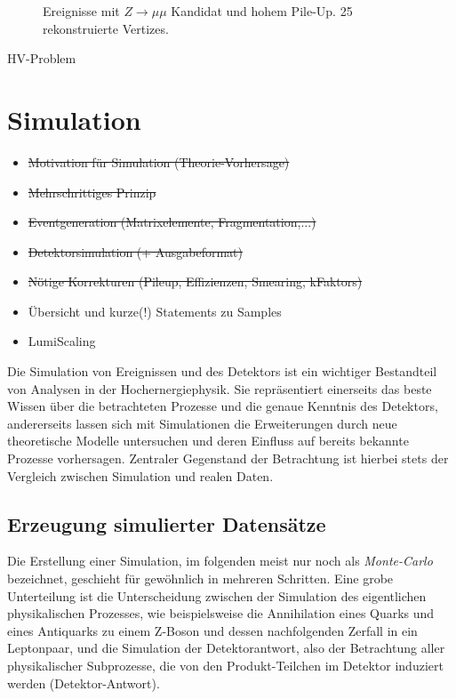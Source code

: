 \begin{figure}
\begin{minipage}[b]{0.48\textwidth}
        \captionsetup{format=plain}
        \caption{Ereignisse mit $Z \rightarrow \mu\mu$ Kandidat und hohem
            Pile-Up. 25 rekonstruierte Vertizes.}
        \label{fig:pileup}
    \end{minipage}
\end{figure}

HV-Problem \development



\section{Simulation}
\label{data_sim_selection:simulation}

\begin{itemize}
    \item \sout{Motivation für Simulation (Theorie-Vorhersage)}
    \item \sout{Mehrschrittiges Prinzip}
    \item \sout{Eventgeneration (Matrixelemente, Fragmentation,...)}
    \item \sout{Detektorsimulation (+ Ausgabeformat)}
    \item \sout{Nötige Korrekturen (Pileup, Effizienzen, Smearing, kFaktors)}
    \item Übersicht und kurze(!) Statements zu Samples
    \item LumiScaling
\end{itemize}

Die Simulation von Ereignissen und des Detektors ist ein wichtiger Bestandteil
von Analysen in der Hochernergiephysik. Sie repräsentiert einerseits das
beste Wissen über die betrachteten Prozesse und die genaue Kenntnis des
Detektors, andererseits lassen sich mit Simulationen die Erweiterungen durch
neue theoretische Modelle untersuchen und deren Einfluss auf bereits bekannte
Prozesse vorhersagen. Zentraler Gegenstand der Betrachtung ist hierbei stets
der Vergleich zwischen Simulation und realen Daten.



\subsection{Erzeugung simulierter Datensätze}
\label{event_generation}
Die Erstellung einer Simulation, im folgenden meist nur noch als
\textit{Monte-Carlo} bezeichnet, geschieht für gewöhnlich in mehreren
Schritten. Eine grobe Unterteilung ist die Unterscheidung zwischen der
Simulation des eigentlichen physikalischen Prozesses, wie beispielsweise die
Annihilation eines Quarks und eines Antiquarks zu einem Z-Boson und dessen
nachfolgenden Zerfall in ein Leptonpaar, und die Simulation der
Detektorantwort, also der Betrachtung aller physikalischer Subprozesse, die von
den Produkt-Teilchen im Detektor induziert werden (Detektor-Antwort).

